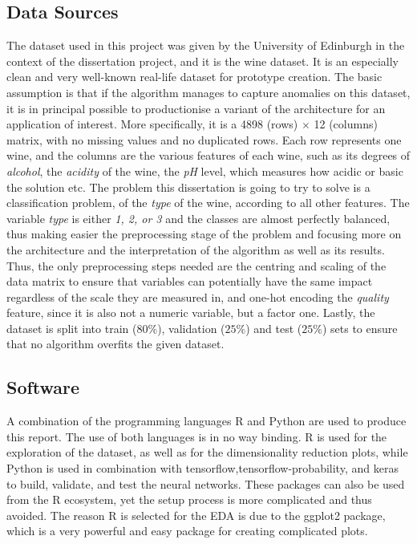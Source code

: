 \documentclass[11pt,twoside]{article}
\numberwithin{Theorem}{section}
\numberwithin{Definition}{section}
\numberwithin{Lemma}{section}
\numberwithin{Algorithm}{section}
\numberwithin{equation}{section}
\begin{document}
\subsection{Data Sources}
\label{sec:back}
The dataset used in this project was given by the University of Edinburgh in the context of the dissertation project, and it is the wine dataset. It is an especially clean and very well-known real-life dataset for prototype creation. The basic assumption is that if the algorithm manages to capture anomalies on this dataset, it is in principal possible to productionise a variant of the architecture for an application of interest. More specifically, it is a 4898 (rows) $\times$ 12 (columns) matrix, with no missing values and no duplicated rows. Each row represents one wine, and the columns are the various features of each wine, such as its degrees of \textit{alcohol}, the \textit{acidity} of the wine, the \textit{pH} level, which measures how acidic or basic the solution etc. The problem this dissertation is going to try to solve is a classification problem, of the \textit{type} of the wine, according to all other features. The variable \textit{type} is either \textit{1, 2, or 3} and the classes are almost perfectly balanced, thus making easier the preprocessing stage of the problem and focusing more on the architecture and the interpretation of the algorithm as well as its results. Thus, the only preprocessing steps needed are the centring and scaling of the data matrix to ensure that variables can potentially have the same impact regardless of the scale they are measured in, and one-hot encoding the \textit{quality} feature, since it is also not a numeric variable, but a factor one. Lastly, the dataset is split into train ($80\%$), validation ($25\%$) and test ($25\%$) sets to ensure that no algorithm overfits the given dataset.
\subsection{Software}
\label{sec:software}
A combination of the programming languages \textsf{R} and \textsf{Python} are used to produce this report. The use of both languages is in no way binding. \textsf{R} is used for the exploration of the dataset, as well as for the dimensionality reduction plots, while \textsf{Python} is used in combination with \textsf{tensorflow},\textsf{tensorflow-probability}, and \textsf{keras} to build, validate, and test the neural networks. These packages can also be used from the \textsf{R} ecosystem, yet the setup process is more complicated and thus avoided. The reason \textsf{R} is selected for the EDA is due to the \textsf{ggplot2} package, which is a very powerful and easy package for creating complicated plots.
\clearpage
\end{document}
